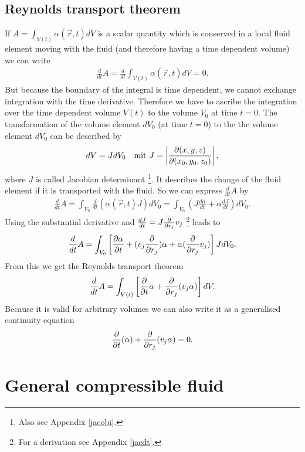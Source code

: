\subsection{Reynolds transport theorem}
If $A=\int_{V(t)} \alpha(\vec{r},t) dV$ is a scalar quantity which is conserved
in a local fluid element moving with the fluid (and therefore having a time
dependent
volume) we can write
\begin{align}
\frac{d}{dt} A = \frac{d}{dt} \int_{V(t)} \alpha(\vec{r},t) dV = 0.
\end{align}
But because the boundary of the integral is time dependent, we cannot exchange
integration with the time derivative. Therefore we have to ascribe the
integration over the time dependent volume $V(t)$ to the volume $V_0$ at time
$t=0$. The transformation of the volume element $dV_0$ (at time $t=0$) to the
the volume element $dV_0$ can be described by
\begin{align}
dV=J dV_0 &&\text{mit } J= \left\lvert\frac{\partial(x,y,z)}{\partial (x_0,
y_0,z_0)}\right\rvert,
\end{align}
where $J$ is called Jacobian determinant \footnote{Also see Appendix
\ref{jacobi}.}. It describes the change of the fluid element if it is
transported with the fluid. So we can express $\frac{d}{dt} A$ by
\begin{align}
\frac{d}{dt} A = \int_{V_0} \frac{d}{dt}(\alpha(\vec{r},t) J) dV_0
= \int_{V_0} \left(J \frac{d\alpha}{dt}+\alpha \frac{dJ}{dt}\right) dV_0.
\end{align}
Using the substantial derivative and $\frac{dJ}{dt}=J \frac{\partial}{\partial r_j} v_j$
\footnote{For a derivation see Appendix \ref{jacdt}.} leads to
\begin{align}
\frac{d}{d t} A = \int_{V_0} \left[\frac{\partial \alpha}{\partial t} + 
(v_j \frac{\partial}{\partial r_j}) \alpha + \alpha (\frac{\partial}{\partial r_j} v_j)\right] J  dV_0.
\end{align}
From this we get the Reynolds transport theorem
\begin{align}
\frac{d}{d t} A = \int_{V(t)} \left[\frac{\partial}{\partial t} \alpha + 
\frac{\partial}{\partial r_j} (v_j \alpha)\right]  dV. \label{eq:RT}
\end{align}
Because it is valid for arbitrary volumes we can also write  it as a generalised
continuity equation
\begin{align}
\frac{\partial}{\partial t}(\alpha)+ \frac{\partial}{\partial r_j} (v_j \alpha) = 0.
\label{eq:RTdiff}
\end{align}
\section{General compressible fluid}
